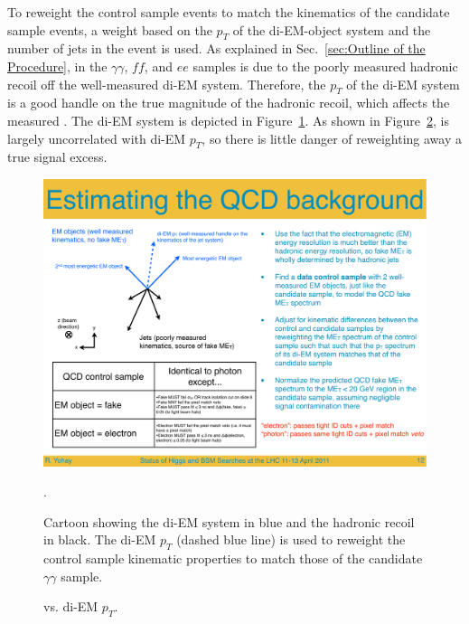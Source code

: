 \documentclass[dissertation.tex]{subfiles}
\begin{document}
To reweight the control sample events to match the kinematics of the candidate sample events, a weight based on the $p_{T}$ of the di-EM-object system and the number of jets in the event is used.  As explained in Sec.~\ref{sec:Outline of the Procedure}, \MET in the $\gamma\gamma$, $\mathit{ff}$, and $ee$ samples is due to the poorly measured hadronic recoil off the well-measured di-EM system.  Therefore, the $p_{T}$ of the di-EM system is a good handle on the true magnitude of the hadronic recoil, which affects the measured \MET.  The di-EM system is depicted in Figure~\ref{fig:di-EM_pT_cartoon}.  As shown in Figure~\ref{fig:MET_vs_di-EM_pT}, \MET is largely uncorrelated with di-EM $p_{T}$, so there is little danger of reweighting away a true signal excess.

\begin{figure}
	\centering
	\includegraphics[scale=0.5]{di-EM_pT_cartoon}
	\caption{Cartoon showing the di-EM system in blue and the hadronic recoil in black.  The di-EM $p_{T}$ (dashed blue line) is used to reweight the control sample kinematic properties to match those of the candidate $\gamma\gamma$ sample.}.
	\label{fig:di-EM_pT_cartoon}
\end{figure}

\begin{figure}
	\centering
	\hspace{1cm}
	\hspace{1cm}
	\caption{\MET vs. di-EM $p_{T}$.}
	\label{fig:MET_vs_di-EM_pT}
\end{figure}
\end{document}
